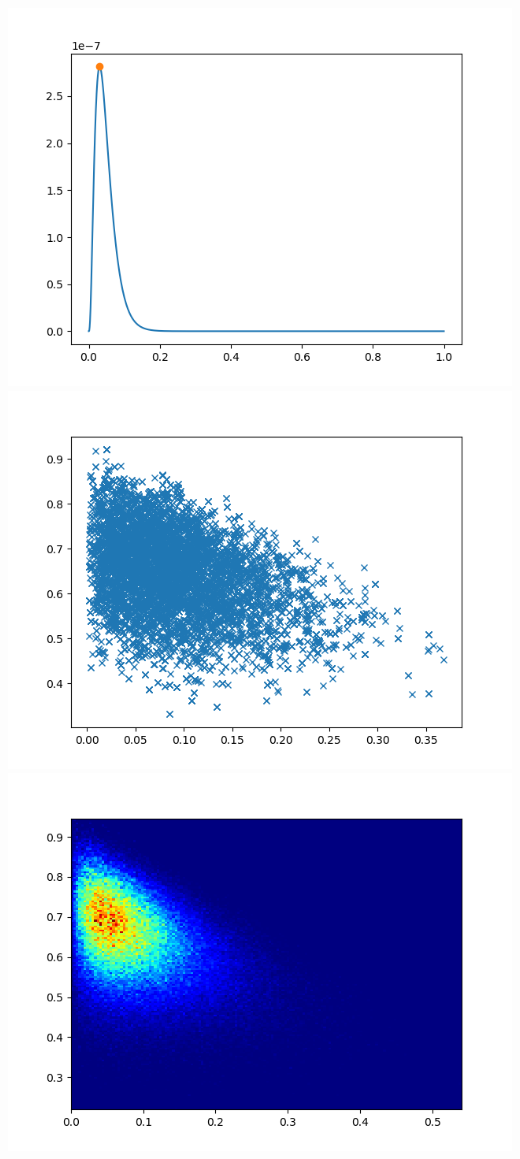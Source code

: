\documentclass[pt12]{article}
\begin{document}
\newpage

\begin{center}
\includegraphics[scale=0.5]{hip13.png}\\
\includegraphics[scale=0.5]{sc13.png}\\
\includegraphics[scale=0.5]{den13.png}\\
\end{center}
\end{document}

